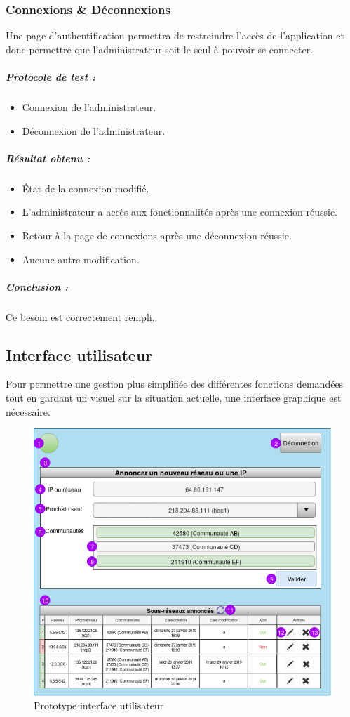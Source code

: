 \subsubsection{Connexions \& Déconnexions}
Une page d'authentification permettra de restreindre l'accès de l'application et donc permettre que l'administrateur soit le seul à pouvoir se connecter.
\subparagraph{Protocole de test :}
\begin{itemize}
    \item Connexion de l'administrateur.
    \item Déconnexion de l'administrateur.
\end{itemize}
\subparagraph{Résultat obtenu :}
    \begin{itemize}
    \item État de la connexion modifié.
    \item L'administrateur a accès aux fonctionnalités après une connexion réussie.
    \item Retour à la page de connexions après une déconnexion réussie.
    \item Aucune autre modification.
\end{itemize}
\subparagraph{Conclusion :}Ce besoin est correctement rempli.

\subsection{Interface utilisateur}
\label{sssec:ui}

Pour permettre une gestion plus simplifiée des différentes fonctions demandées tout en gardant un visuel sur la situation actuelle, une interface graphique est nécessaire.

\begin{figure}[H]
    \includegraphics[width=\textwidth]{./medias/ui_interface.png}
    \caption{Prototype interface utilisateur}
    \label{fig:ui_interfaces}
\end{figure}

